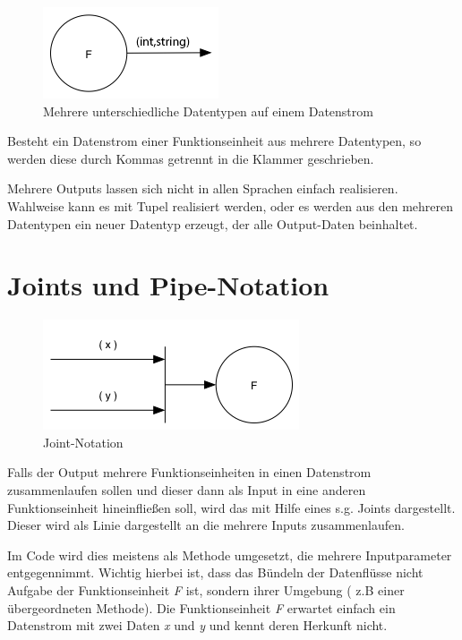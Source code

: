 \begin{figure}[!htbp]
	\centering
	\includegraphics[width=.5\linewidth]{./img/diagramIntString.png}
	\caption{Mehrere unterschiedliche Datentypen auf einem Datenstrom}
\end{figure}


Besteht ein Datenstrom einer Funktionseinheit aus mehrere Datentypen, so werden diese durch Kommas getrennt in die Klammer geschrieben.

Mehrere Outputs lassen sich nicht in allen Sprachen einfach realisieren.
Wahlweise kann es mit Tupel realisiert werden, oder es werden aus den mehreren Datentypen ein 
neuer Datentyp erzeugt, der alle Output-Daten beinhaltet.

\section{Joints und Pipe-Notation}

\begin{figure}[!htbp]
	\centering
	\includegraphics[width=.7\linewidth]{./img/diagramJoin.png}
	\caption{Joint-Notation}
\end{figure}


Falls der Output mehrere Funktionseinheiten in einen Datenstrom zusammenlaufen
sollen und dieser dann als Input in eine anderen Funktionseinheit hineinfließen
soll, wird das mit Hilfe eines s.g. Joints dargestellt. 
Dieser wird als Linie dargestellt an die mehrere Inputs zusammenlaufen.

Im Code wird dies meistens als Methode umgesetzt, die mehrere Inputparameter entgegennimmt.
Wichtig hierbei ist, dass das Bündeln der Datenflüsse nicht Aufgabe der
Funktionseinheit \textit{F} ist, sondern ihrer Umgebung ( z.B einer übergeordneten Methode).
Die Funktionseinheit \textit{F} erwartet einfach ein Datenstrom mit zwei Daten \textit{x} und \textit{y}
und kennt deren Herkunft nicht.

